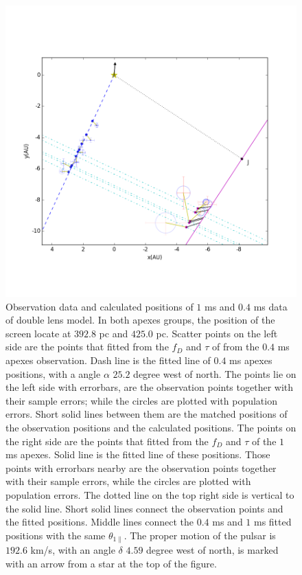 \documentclass[useAMS,usenatbib]{mn2e}
\begin{document}
\begin{figure}
\centering
\includegraphics[width=1.0\textwidth, angle=0]{Double_lens_xy.png}
\caption{Observation data and calculated positions of $1$ ms and $0.4$ ms data of double lens model. In both apexes groups, the position of the screen locate at $392.8$ pc and $425.0$ pc. Scatter points on the left side are the points that fitted from the $f_D$ and $\tau$ of from the $0.4$ ms apexes observation. Dash line is the fitted line of $0.4$ ms apexes positions, with a angle $\alpha$ $25.2$ degree west of north. The points lie on the left side with errorbars, are the observation points together with their sample errors; while the circles are plotted with population errors. Short solid lines between them are the matched positions of the observation positions and the calculated positions. The points on the right side are the points that fitted from the $f_D$ and $\tau$ of the $1$ ms apexes. Solid line is the fitted line of these positions. Those points with errorbars nearby are the observation points together with their sample errors, while the circles are plotted with population errors. The dotted line on the top right side is vertical to the solid line. Short solid lines connect the observation points and the fitted positions. Middle lines connect the $0.4$ ms and $1$ ms fitted positions with the same $\theta_{1\parallel}$. The proper motion of the pulsar is $192.6$ km/s, with an angle $\delta$ $4.59$ degree west of north, is marked with an arrow from a star at the top of the figure.}
\label{Doublelens}
\end{figure}
\end{document}
